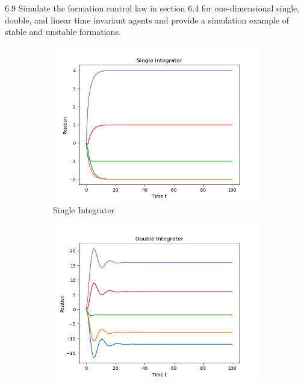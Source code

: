\documentclass{article}
\begin{document}
\newpage
\begin{problem} 6.9
    Simulate the formation control law in section 6.4 for one-dimensional
    single, double, and linear time invariant agents and provide a simulation example of stable and unstable formations.

    \begin{figure}[!h]
        \centering
        \begin{subfigure}{0.4\textwidth}
            \includegraphics[width=\textwidth]{./img/p5_1.png}
            \caption{Single Integrater}
        \end{subfigure}
        \begin{subfigure}{0.4\textwidth}
            \includegraphics[width=\textwidth]{./img/p5_2.png}

\end{subfigure}
\end{figure}
\end{problem}
\end{document}
